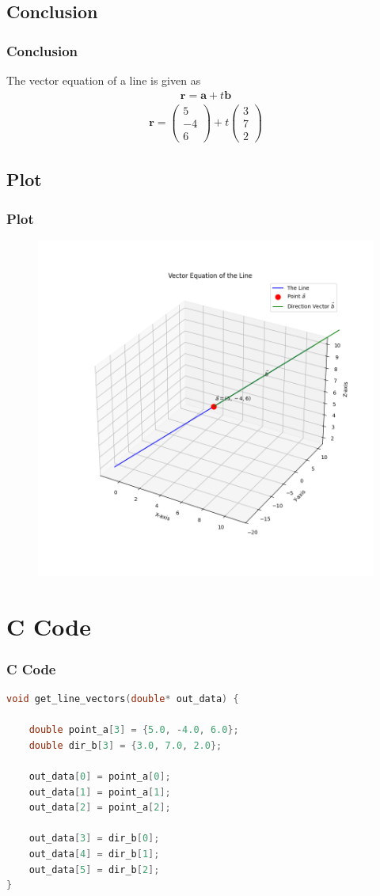 \documentclass{beamer}
\theoremstyle{remark}
\newcommand{\myvec}[1]{\ensuremath{\begin{pmatrix}#1\end{pmatrix}}}
\let\vec\mathbf
\numberwithin{equation}{section}
\begin{document}
\subsection{Conclusion}
\begin{frame}
\frametitle{Conclusion}
 The vector equation of a line is given as
\begin{align}
    \vec{r}=\vec{a}+t\vec{b} 
    \end{align}
    \begin{align}
    \vec{r}=\myvec{5\\-4\\6}+t\myvec{3\\7\\2}
\end{align}
\end{frame}

\subsection{Plot}
\begin{frame}[fragile]
\frametitle{Plot}

\begin{figure}[h!]
   \centering
   \includegraphics[width=0.7\columnwidth]{figs/fig1.png}
	\caption{}
   \label{}
\end{figure}
\end{frame}

\section{C Code}
\begin{frame}[fragile]
\frametitle{C Code}
\begin{lstlisting}[language=C]
void get_line_vectors(double* out_data) {
 
    double point_a[3] = {5.0, -4.0, 6.0};
    double dir_b[3] = {3.0, 7.0, 2.0};
    
    out_data[0] = point_a[0];
    out_data[1] = point_a[1];
    out_data[2] = point_a[2];
    
    out_data[3] = dir_b[0];
    out_data[4] = dir_b[1];
    out_data[5] = dir_b[2];
}
    \end{lstlisting}
\end{frame}
\end{document}
